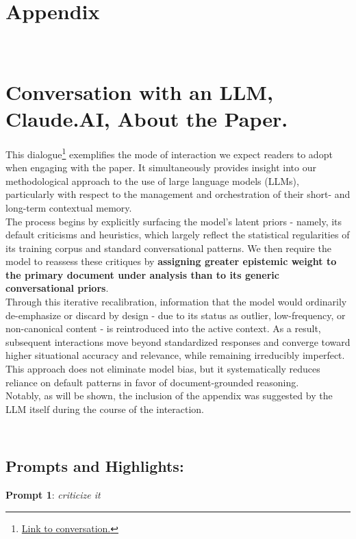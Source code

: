 \documentclass{article}
\begin{document}
\clearpage
\appendix
\section*{Appendix}
\section{\\Conversation with an LLM, Claude.AI, About the Paper.}

This dialogue\footnote{\href{https://claude.ai/share/6ed3a944-4e04-4941-aabd-03bd61873d90}{Link to conversation.}} exemplifies the mode of interaction we expect readers to adopt when engaging with the paper. It simultaneously provides insight into our methodological approach to the use of large language models (LLMs), particularly with respect to the management and orchestration of their short- and long-term contextual memory.\\

The process begins by explicitly surfacing the model’s latent priors - namely, its default criticisms and heuristics, which largely reflect the statistical regularities of its training corpus and standard conversational patterns. We then require the model to reassess these critiques by \textbf{assigning greater epistemic weight to the primary document under analysis than to its generic conversational priors}.\\

Through this iterative recalibration, information that the model would ordinarily de-emphasize or discard by design - due to its status as outlier, low-frequency, or non-canonical content - is reintroduced into the active context. As a result, subsequent interactions move beyond standardized responses and converge toward higher situational accuracy and relevance, while remaining irreducibly imperfect. This approach does not eliminate model bias, but it systematically reduces reliance on default patterns in favor of document-grounded reasoning.\\

Notably, as will be shown, the inclusion of the appendix was suggested by the LLM itself during the course of the interaction.\\


\subsection{\\Prompts and Highlights:}
\textbf{Prompt 1}: \textit{criticize it}\\
\end{document}
